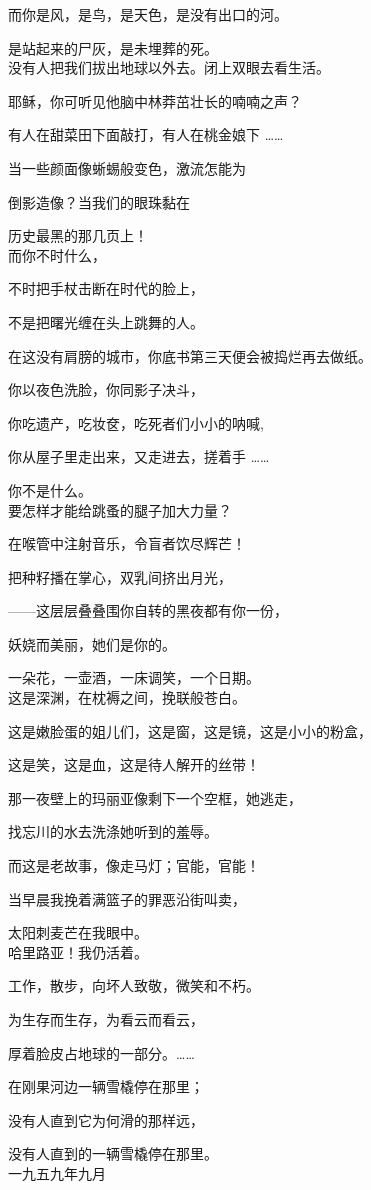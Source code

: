 而你是风，是鸟，是天色，是没有出口的河。

是站起来的尸灰，是未埋葬的死。\\


没有人把我们拔出地球以外去。闭上双眼去看生活。

耶稣，你可听见他脑中林莽茁壮长的喃喃之声？

有人在甜菜田下面敲打，有人在桃金娘下 \dots \dots

当一些颜面像蜥蜴般变色，激流怎能为

倒影造像？当我们的眼珠黏在

历史最黑的那几页上！\\


而你不时什么，

不时把手杖击断在时代的脸上，

不是把曙光缠在头上跳舞的人。

在这没有肩膀的城市，你底书第三天便会被捣烂再去做纸。

你以夜色洗脸，你同影子决斗，

你吃遗产，吃妆奁，吃死者们小小的呐喊,

你从屋子里走出来，又走进去，搓着手 \dots\dots

你不是什么。\\


要怎样才能给跳蚤的腿子加大力量？

在喉管中注射音乐，令盲者饮尽辉芒！

把种籽播在掌心，双乳间挤出月光，

——这层层叠叠围你自转的黑夜都有你一份，

妖娆而美丽，她们是你的。

一朵花，一壶酒，一床调笑，一个日期。\\



这是深渊，在枕褥之间，挽联般苍白。

这是嫩脸蛋的姐儿们，这是窗，这是镜，这是小小的粉盒，

这是笑，这是血，这是待人解开的丝带！

那一夜壁上的玛丽亚像剩下一个空框，她逃走，

找忘川的水去洗涤她听到的羞辱。

而这是老故事，像走马灯；官能，官能！

当早晨我挽着满篮子的罪恶沿街叫卖，

太阳刺麦芒在我眼中。\\


哈里路亚！我仍活着。

工作，散步，向坏人致敬，微笑和不朽。

为生存而生存，为看云而看云，

厚着脸皮占地球的一部分。\dots \dots

在刚果河边一辆雪橇停在那里；

没有人直到它为何滑的那样远，

没有人直到的一辆雪橇停在那里。\\

一九五九年九月
